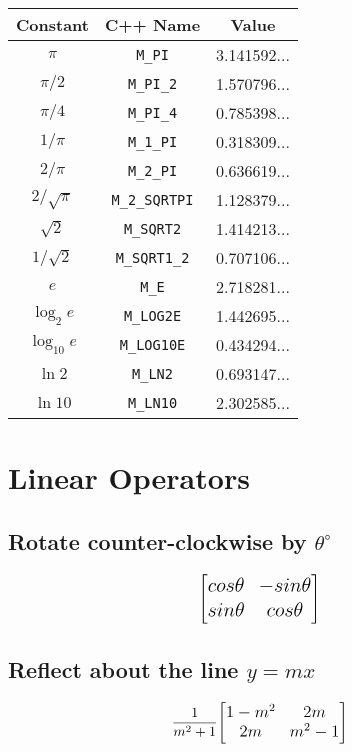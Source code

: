 \documentclass[11pt, a4paper, oneside]{book}
\begin{document}
\begin{center}
\begin{tabular}{|c|c|c|}
  \hline
  Constant & C++ Name & Value \\
  \hline
  $\pi$ & \texttt{M\_PI} & 3.141592... \\
  \hline
  $\pi / 2$ & \texttt{M\_PI\_2} & 1.570796... \\
  \hline
  $\pi / 4$ & \texttt{M\_PI\_4} & 0.785398... \\
  \hline
  $1 / \pi$ & \texttt{M\_1\_PI} & 0.318309... \\
  \hline
  $2 / \pi$ & \texttt{M\_2\_PI} & 0.636619... \\
  \hline
  $2 / \sqrt{\pi}$ & \texttt{M\_2\_SQRTPI} & 1.128379... \\
  \hline
  $\sqrt{2}$ & \texttt{M\_SQRT2} & 1.414213... \\
  \hline
  $1 / \sqrt{2}$ & \texttt{M\_SQRT1\_2} & 0.707106... \\
  \hline
  $e$ & \texttt{M\_E} & 2.718281... \\
  \hline
  $\log_2{e}$ & \texttt{M\_LOG2E} & 1.442695... \\
  \hline
  $\log_{10}{e}$ & \texttt{M\_LOG10E} & 0.434294... \\
  \hline
  $\ln{2}$ & \texttt{M\_LN2} & 0.693147... \\
  \hline
  $\ln{10}$ & \texttt{M\_LN10} & 2.302585... \\
  \hline
\end{tabular}
\end{center}

\section{Linear Operators}

\subsection{Rotate counter-clockwise by $\theta ^\circ$}
\begin{equation*} 
\Large{
\begin{bmatrix}
    cos \theta & -sin \theta \\
    sin \theta & cos \theta
\end{bmatrix}
}
\end{equation*}


\subsection{Reflect about the line $y = mx$ }
\begin{equation*}
\LARGE{\frac{1}{m^2+1}}
\large{
\begin{bmatrix}
    1 - m^2 & 2m \\
    2m & m^2 - 1
\end{bmatrix}
}  
\end{equation*} 
\end{document}

